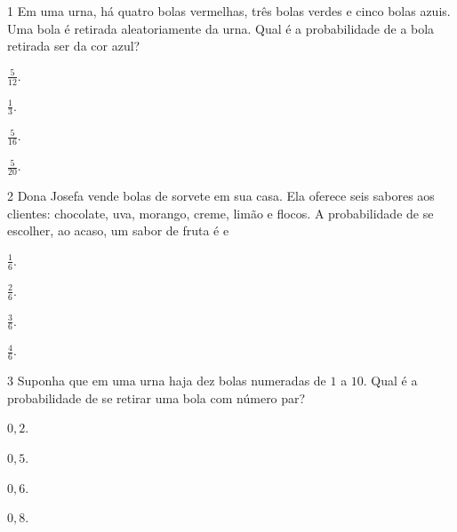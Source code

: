 \num{1} Em uma urna, há quatro bolas vermelhas, três bolas verdes e cinco bolas azuis.
Uma bola é retirada aleatoriamente da urna. Qual é a probabilidade de a bola
retirada ser da cor azul?

\begin{escolha}
\item $\frac{5}{12}$.

\item $\frac{1}{3}$.

\item $\frac{5}{16}$.

\item $\frac{5}{20}$.
\end{escolha}

\num{2} Dona Josefa vende bolas de sorvete em sua casa. Ela oferece seis sabores
aos clientes: chocolate, uva, morango, creme, limão e flocos.
A probabilidade de se escolher, ao acaso, um sabor de fruta é e

\begin{escolha}
\item $\frac{1}{6}$.
\item $\frac{2}{6}$.
\item $\frac{3}{6}$.
\item $\frac{4}{6}$.
\end{escolha}

\num{3} Suponha que em uma urna haja dez bolas numeradas de $1$ a $10$. Qual é a
probabilidade de se retirar uma bola com número par?

\begin{escolha}
\item $0,2$.
\item $0,5$.
\item $0,6$.
\item $0,8$.
\end{escolha}